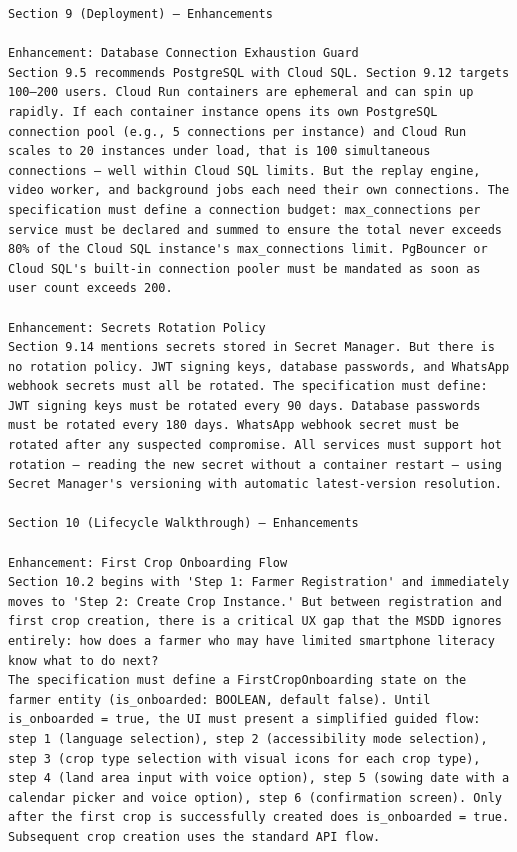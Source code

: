 \documentclass{article}
\begin{document}
\begin{verbatim}
Section 9 (Deployment) — Enhancements

Enhancement: Database Connection Exhaustion Guard
Section 9.5 recommends PostgreSQL with Cloud SQL. Section 9.12 targets 100–200 users. Cloud Run containers are ephemeral and can spin up rapidly. If each container instance opens its own PostgreSQL connection pool (e.g., 5 connections per instance) and Cloud Run scales to 20 instances under load, that is 100 simultaneous connections — well within Cloud SQL limits. But the replay engine, video worker, and background jobs each need their own connections. The specification must define a connection budget: max_connections per service must be declared and summed to ensure the total never exceeds 80% of the Cloud SQL instance's max_connections limit. PgBouncer or Cloud SQL's built-in connection pooler must be mandated as soon as user count exceeds 200.

Enhancement: Secrets Rotation Policy
Section 9.14 mentions secrets stored in Secret Manager. But there is no rotation policy. JWT signing keys, database passwords, and WhatsApp webhook secrets must all be rotated. The specification must define: JWT signing keys must be rotated every 90 days. Database passwords must be rotated every 180 days. WhatsApp webhook secret must be rotated after any suspected compromise. All services must support hot rotation — reading the new secret without a container restart — using Secret Manager's versioning with automatic latest-version resolution.

Section 10 (Lifecycle Walkthrough) — Enhancements

Enhancement: First Crop Onboarding Flow
Section 10.2 begins with 'Step 1: Farmer Registration' and immediately moves to 'Step 2: Create Crop Instance.' But between registration and first crop creation, there is a critical UX gap that the MSDD ignores entirely: how does a farmer who may have limited smartphone literacy know what to do next?
The specification must define a FirstCropOnboarding state on the farmer entity (is_onboarded: BOOLEAN, default false). Until is_onboarded = true, the UI must present a simplified guided flow: step 1 (language selection), step 2 (accessibility mode selection), step 3 (crop type selection with visual icons for each crop type), step 4 (land area input with voice option), step 5 (sowing date with a calendar picker and voice option), step 6 (confirmation screen). Only after the first crop is successfully created does is_onboarded = true. Subsequent crop creation uses the standard API flow.


\end{verbatim}
\end{document}
